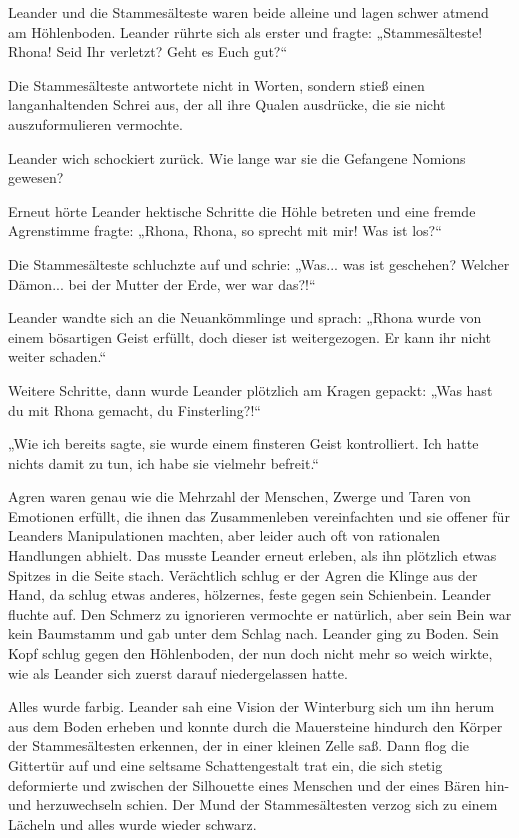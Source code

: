 \documentclass[10pt, a4paper, oneside]{book}
\begin{document}
Leander und die Stammesälteste waren beide alleine und lagen schwer atmend am Höhlenboden. Leander rührte sich als erster und fragte: „Stammesälteste! Rhona! Seid Ihr verletzt? Geht es Euch gut?“

Die Stammesälteste antwortete nicht in Worten, sondern stieß einen langanhaltenden Schrei aus, der all ihre Qualen ausdrücke, die sie nicht auszuformulieren vermochte.

Leander wich schockiert zurück. Wie lange war sie die Gefangene Nomions gewesen?

Erneut hörte Leander hektische Schritte die Höhle betreten und eine fremde Agrenstimme fragte: „Rhona, Rhona, so sprecht mit mir! Was ist los?“

Die Stammesälteste schluchzte auf und schrie: „Was... was ist geschehen? Welcher Dämon... bei der Mutter der Erde, wer war das?!“

Leander wandte sich an die Neuankömmlinge und sprach: „Rhona wurde von einem bösartigen Geist erfüllt, doch dieser ist weitergezogen. Er kann ihr nicht weiter schaden.“

Weitere Schritte, dann wurde Leander plötzlich am Kragen gepackt: „Was hast du mit Rhona gemacht, du Finsterling?!“

„Wie ich bereits sagte, sie wurde einem finsteren Geist kontrolliert. Ich hatte nichts damit zu tun, ich habe sie vielmehr befreit.“

Agren waren genau wie die Mehrzahl der Menschen, Zwerge und Taren von Emotionen erfüllt, die ihnen das Zusammenleben vereinfachten und sie offener für Leanders Manipulationen machten, aber leider auch oft von rationalen Handlungen abhielt. Das musste Leander erneut erleben, als ihn plötzlich etwas Spitzes in die Seite stach. Verächtlich schlug er der Agren die Klinge aus der Hand, da schlug etwas anderes, hölzernes, feste gegen sein Schienbein. Leander fluchte auf. Den Schmerz zu ignorieren vermochte er natürlich, aber sein Bein war kein Baumstamm und gab unter dem Schlag nach. Leander ging zu Boden. Sein Kopf schlug gegen den Höhlenboden, der nun doch nicht mehr so weich wirkte, wie als Leander sich zuerst darauf niedergelassen hatte.

Alles wurde farbig. Leander sah eine Vision der Winterburg sich um ihn herum aus dem Boden erheben und konnte durch die Mauersteine hindurch den Körper der Stammesältesten erkennen, der in einer kleinen Zelle saß. Dann flog die Gittertür auf und eine seltsame Schattengestalt trat ein, die sich stetig deformierte und zwischen der Silhouette eines Menschen und der eines Bären hin- und herzuwechseln schien. Der Mund der Stammesältesten verzog sich zu einem Lächeln und alles wurde wieder schwarz.
\end{document}
